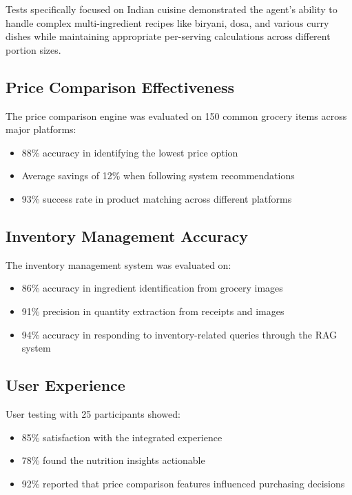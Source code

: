 \documentclass{ecai}
\begin{document}
Tests specifically focused on Indian cuisine demonstrated the agent's ability to handle complex multi-ingredient recipes like biryani, dosa, and various curry dishes while maintaining appropriate per-serving calculations across different portion sizes.

\subsection{Price Comparison Effectiveness}

The price comparison engine was evaluated on 150 common grocery items across major platforms:
\begin{itemize}[noitemsep,topsep=0pt]
    \item 88\% accuracy in identifying the lowest price option
    \item Average savings of 12\% when following system recommendations
    \item 93\% success rate in product matching across different platforms
\end{itemize}

\subsection{Inventory Management Accuracy}

The inventory management system was evaluated on:
\begin{itemize}[noitemsep,topsep=0pt]
    \item 86\% accuracy in ingredient identification from grocery images
    \item 91\% precision in quantity extraction from receipts and images
    \item 94\% accuracy in responding to inventory-related queries through the RAG system
\end{itemize}

\subsection{User Experience}

User testing with 25 participants showed:
\begin{itemize}[noitemsep,topsep=0pt]
    \item 85\% satisfaction with the integrated experience
    \item 78\% found the nutrition insights actionable
    \item 92\% reported that price comparison features influenced purchasing decisions
\end{itemize}
\end{document}
